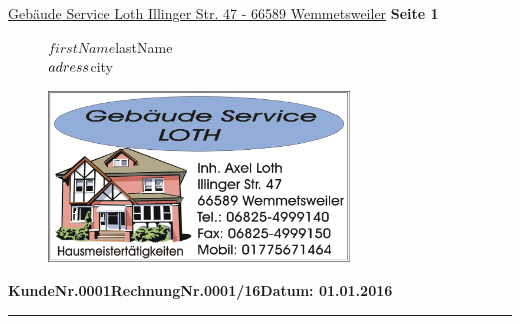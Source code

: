 \documentclass[11pt]{scrartcl}
\begin{document}
\begin{scriptsize}
\underline{Gebäude Service Loth Illinger Str. 47 - 66589 Wemmetsweiler} \hfill \textbf{Seite 1}
\end{scriptsize}

\onehalfspacing

\begin{figure}[h]
\begin{minipage}{9cm}
$firstName $lastName\\
$adress \bigskip \\
$city\\
\end{minipage}
\begin{minipage}{8cm}
\includegraphics [width=8cm]{logo.png}
\end{minipage}
\end{figure}

\singlespacing

\bigskip

\begin{flushright}

\textbf{Kunde\hspace{1cm}Nr.\hspace{1cm}0001\hspace{1cm}Rechnung\hspace{1cm}Nr.\hspace{1cm}0001/16\hfill Datum: 01.01.2016\\}
{\hrule height 2pt}

\end{flushright}

\bigskip

\renewcommand{\arraystretch}{2}


\end{document}
